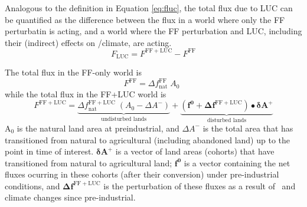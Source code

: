 Analogous to the definition in Equation \ref{eq:fluc}, the total flux due to LUC can be quantified as the difference between the flux in a world where only the FF perturbatin is acting, and a world where the FF perturbation and LUC, including their (indirect) effects on \coo /climate, are acting.
\begin{equation}
F_{\mathrm{LUC}} = F^{\mathrm{FF+LUC}} - F^{\mathrm{FF}}
\label{eq:fluc.gc}
\end{equation}

\noindent The total flux in the FF-only world is
\begin{equation}
F^{\mathrm{FF}} = \Delta f^{\mathrm{FF}}_{\mathrm{nat}}\; A_0 \; \,
\end{equation}
while the total flux in the FF+LUC world is
\begin{equation}
F^{\mathrm{FF+LUC}} =  \underbrace{\Delta f^{\mathrm{FF+LUC}}_{\mathrm{nat}}\; (A_0 - \Delta A^-)}_{\text{undisturbed lands}} + \underbrace{(\mathbf{f^0} + \mathbf{\Delta f^{\mathrm{FF+LUC}}}) \bullet \mathbf{\delta A^+}}_{\text{disturbed lands}}
\label{eq:totalflux}
\end{equation}
A$_0$ is the natural land area at preindustrial, and $\Delta A^-$ is the total area that has transitioned from natural to agricultural (including abandoned land) up to the point in time of interest. $\mathbf{\delta A^+}$ is a vector of land areas (cohorts) that have transitioned from natural to agricultural land; $\mathbf{f^0}$ is a vector containing the net fluxes ocurring in these cohorts (after their conversion) under pre-industrial conditions, and $\mathbf{\Delta f^{\mathrm{FF+LUC}}}$ is the perturbation of these fluxes as a result of \coo\ and climate changes since pre-industrial.\\

